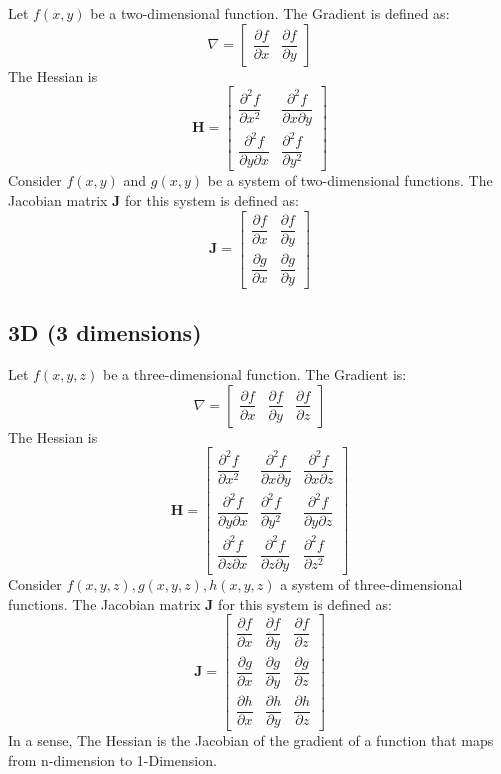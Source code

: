 \documentclass[11pt,a4paper]{book}
\theoremstyle{definition}\newtheorem{definition}{Definition}
\theoremstyle{definition}\newtheorem{fact}{Fact}
\theoremstyle{definition}\newtheorem{remark}{Remark}
\theoremstyle{definition}\newtheorem{ex}{Ex.}
\theoremstyle{definition}\newtheorem{project}{Project}
\theoremstyle{definition}\newtheorem{problem}{Problem}
\theoremstyle{definition}\newtheorem{example}{Example}
\numberwithin{theorem}{section}
\numberwithin{corollary}{chapter}
\numberwithin{assumption}{chapter}
\numberwithin{definition}{chapter}
\numberwithin{prop}{chapter}
\numberwithin{notation}{chapter}
\numberwithin{problem}{chapter}
\numberwithin{example}{chapter}
\numberwithin{fact}{chapter}
\numberwithin{ex}{chapter}
\def\H{\mathbf H}
\begin{document}
\begin{appendices}
	Let \( f(x, y) \) be a two-dimensional function. The Gradient is defined as:
	\[
	\nabla =
	\begin{bmatrix}
		\dfrac{\partial f}{\partial x} & \dfrac{\partial f}{\partial y}
	\end{bmatrix}
	\]
	The Hessian is 
	\[
	\H = \begin{bmatrix}
		\dfrac{\partial^2 f}{\partial x^2} & \dfrac{\partial^2 f}{\partial x \partial y} \\
		\dfrac{\partial^2 f}{\partial y \partial x} & \dfrac{\partial^2 f}{\partial y^2}
	\end{bmatrix}
	\]
	Consider \( f(x, y) \) and \( g(x, y) \) be a system of two-dimensional functions. The Jacobian matrix \( \mathbf{J} \) for this system is defined as:
	\[
	\mathbf{J} =
	\begin{bmatrix}
		\dfrac{\partial f}{\partial x} & \dfrac{\partial f}{\partial y} \\
		\dfrac{\partial g}{\partial x} & \dfrac{\partial g}{\partial y}
	\end{bmatrix}
	\]
	
	\subsection*{3D (3 dimensions)}
	Let \( f(x, y, z) \) be a three-dimensional function. The Gradient is:
	\[
	\nabla =
	\begin{bmatrix}
		\dfrac{\partial f}{\partial x} & \dfrac{\partial f}{\partial y} & \dfrac{\partial f}{\partial z}
	\end{bmatrix}
	\]
	The Hessian is
	\[
	\H = \begin{bmatrix}
		\dfrac{\partial^2 f}{\partial x^2} & \dfrac{\partial^2 f}{\partial x \partial y} & \dfrac{\partial^2 f}{\partial x \partial z} \\
		\dfrac{\partial^2 f}{\partial y \partial x} & \dfrac{\partial^2 f}{\partial y^2} & \dfrac{\partial^2 f}{\partial y \partial z} \\
		\dfrac{\partial^2 f}{\partial z \partial x} & \dfrac{\partial^2 f}{\partial z \partial y} & \dfrac{\partial^2 f}{\partial z^2}
	\end{bmatrix}
	\]	
	Consider $f(x, y, z), g(x, y, z), h(x, y, z)$ a system of three-dimensional functions. The Jacobian matrix \( \mathbf{J} \) for this system is defined as:
	\[
	\mathbf{J} =
	\begin{bmatrix}
		\dfrac{\partial f}{\partial x} & \dfrac{\partial f}{\partial y} & \dfrac{\partial f}{\partial z} \\
		\dfrac{\partial g}{\partial x} & \dfrac{\partial g}{\partial y} & \dfrac{\partial g}{\partial z} \\
		\dfrac{\partial h}{\partial x} & \dfrac{\partial h}{\partial y} & \dfrac{\partial h}{\partial z}
	\end{bmatrix}
	\]
	In a sense, The Hessian is the Jacobian of the gradient of a function that maps from n-dimension to 1-Dimension.
	

\end{appendices}
\end{document}
